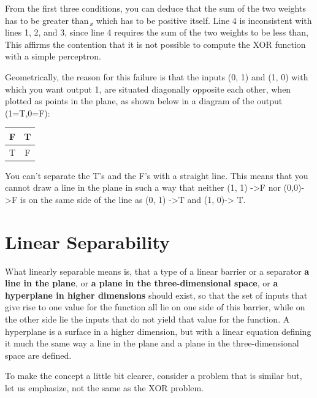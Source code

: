 \documentclass[12pt, right open]{memoir}
\begin{document}
From the first three conditions, you can deduce that the sum of the two weights has to be greater than  ̧, which has to be positive itself. Line 4 is inconsistent with lines 1, 2, and 3, since line 4 requires the sum of the two weights to be less than, This affirms the contention that it is not possible to compute the XOR function with a simple perceptron.

Geometrically, the reason for this failure is that the inputs (0, 1) and (1, 0) with which you want output 1, are situated diagonally opposite each other, when plotted as points in the plane, as shown below in a diagram of the output (1=T,0=F): \\

\begin{tabular}{|c|c|}
\hline
F & T \\ \hline
T & F \\ \hline
\end{tabular}

You can’t separate the T’s and the F’s with a straight line. This means that you cannot draw a line in the plane in such a way that neither (1, 1) ->F nor (0,0)->F is on the same side of the line as (0, 1) ->T and (1, 0)-> T.

\section{Linear Separability}
What linearly separable means is, that a type of a linear barrier or a
separator \textbf{a line in the plane}, or \textbf{a plane in the three-dimensional space}, or \textbf{a hyperplane in higher dimensions} should exist, so that the set of inputs that give rise to one value for the function all lie on one side of this barrier, while on the other side lie the inputs that do not yield that value for the function. A hyperplane is a surface in a higher dimension, but with a linear equation defining it much the same way a line in the plane and a plane in the three-dimensional space are defined.

To make the concept a little bit clearer, consider a problem that is similar but, let us emphasize, not the same as the XOR problem.
\end{document}
